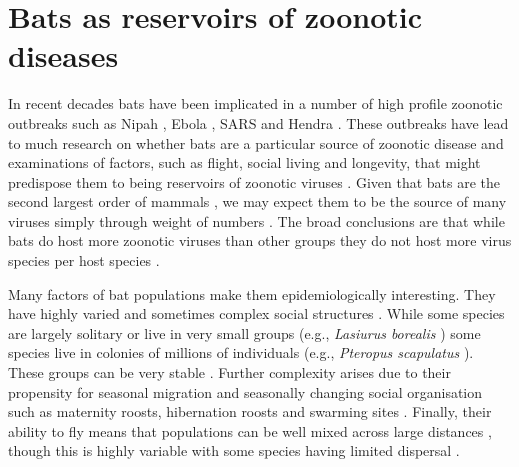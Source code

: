 
\section{Bats as reservoirs of zoonotic diseases}


In recent decades bats have been implicated in a number of high profile zoonotic outbreaks such as Nipah \cite{field2001natural, halpin2011pteropid}, Ebola \cite{leroy2005fruit}, SARS \cite{li2005bats} and Hendra \cite{field2001natural}.
These outbreaks have lead to much research on whether bats are a particular source of zoonotic disease \cite{luis2013comparison, olival2015bats, wang2011mass} and examinations of factors, such as flight, social living and longevity, that might predispose them to being reservoirs of zoonotic viruses \cite{calisher2006bats, o2014bat, dobson2005links, racey2015uniqueness, kuzmin2011bats}.
Given that bats are the second largest order of mammals \cite{wilson2005mammal}, we may expect them to be the source of many viruses simply through weight of numbers \cite{luis2013comparison}.
The broad conclusions are that while bats do host more zoonotic viruses than other groups \cite{luis2013comparison} they do not host more virus species per host species \cite{olival2015bats}.

Many factors of bat populations make them epidemiologically interesting.
They have highly varied and sometimes complex social structures \cite{kerth2008causes}.
While some species are largely solitary or live in very small groups (e.g., \emph{Lasiurus borealis} \cite{shump1982lasiurus}) some species live in colonies of millions of individuals (e.g., \emph{Pteropus scapulatus} \cite{birt2008little}).
These groups can be very stable \cite{kerth2011bats, mccracken1981social}.
Further complexity arises due to their propensity for seasonal migration \cite{fleming2003ecology, richter2008first, cryan2014continental} and seasonally changing social organisation such as maternity roosts, hibernation roosts and swarming sites \cite{kerth2008causes}.
Finally, their ability to fly means that populations can be well mixed across large distances \cite{peel2013continent, petit1999male}, though this is highly variable with some species having limited dispersal \cite{wilmer1994extreme}.

